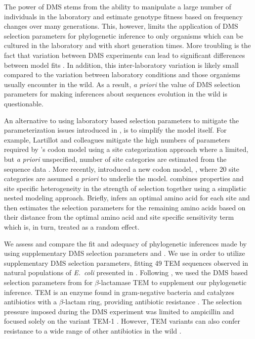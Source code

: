 The power of DMS stems from the ability to manipulate a large number of individuals in the laboratory and estimate genotype fitness based on frequency changes over many generations.
This, however, limits the application of DMS selection parameters for phylogenetic inference to only organisms which can be cultured in the laboratory and with short generation times.
More troubling is the fact that variation between DMS experiments can lead to significant differences between model fits \citep{hilton2017}.
In addition, this inter-laboratory variation is likely small compared to the variation between laboratory conditions and those organisms usually encounter in the wild.
As a result, \emph{a priori} the value of DMS selection parameters for making inferences about sequences evolution in the wild is questionable.

An alternative to using laboratory based selection parameters to mitigate the parameterization issues introduced in \hb, is to simplify the \hb model itself.
For example, Lartillot and colleagues mitigate the high numbers of  parameters required by \hb's codon model using a site categorization approach where a limited, but \emph{a priori} unspecified, number of site categories are estimated from the sequence data \citep{LartillotAndPhilippe2004,le2008,RodrigueEtAl2008,RodrigueAndLartillot2014}.
More recently, \citep{beaulieu2019} introduced a new codon model, \selac, where $20$ site categories are assumed \emph{a priori} to underlie the \hb model.
\selac combines \PC properties and site specific heterogeneity in the strength of selection together using a simplistic nested modeling approach.
Briefly, \selac infers an optimal amino acid for each site and then estimates the selection parameters for the remaining amino acids based on their \PC distance from the optimal amino acid and site specific sensitivity term which is, in turn, treated as a random effect.

We assess and compare the fit and adequacy of phylogenetic inferences made by \phydms using supplementary DMS selection parameters and \selac. 
We use \phydms \citep{hilton2017} in order to utilize supplementary DMS selection parameters, fitting 49 TEM sequences observed in natural populations of \emph{E.~coli} presented in \citet{bloom2017}.
Following \citet{bloom2017, hilton2017}, we used the DMS based selection parameters from \citet{stiffler2016} for $\beta$-lactamase TEM to supplement our phylogenetic inference.
TEM is an enzyme found in gram-negative bacteria and catalyzes antibiotics with a $\beta$-lactam ring, providing antibiotic resistance \citep{Neu1969}.
The selection pressure imposed during the DMS experiment was limited to ampicillin and focused solely on the variant TEM-1 \citep{stiffler2016}.
However, TEM variants can also confer resistance to a wide range of other antibiotics in the wild \citep{sougakoff1988,sougakoff1989,goussard1991,mabilat1992,chanal1992,brun1994}.

